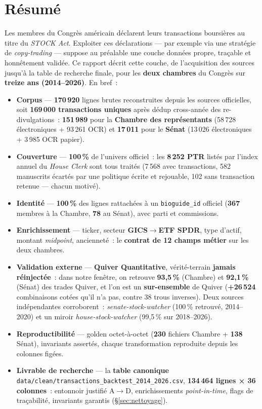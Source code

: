 \documentclass[11pt,a4paper]{article}
\newcommand{\co}[1]{\texttt{\small #1}}
\begin{document}
\section*{Résumé}
Les membres du Congrès américain déclarent leurs transactions boursières au titre du \emph{STOCK Act}.
Exploiter ces déclarations — par exemple via une stratégie de \emph{copy-trading} — suppose au préalable
une couche données propre, traçable et honnêtement validée. Ce rapport décrit cette couche, de
l'acquisition des sources jusqu'à la table de recherche finale, pour les \textbf{deux chambres} du
Congrès sur \textbf{treize ans (2014--2026)}. En bref~:
\begin{itemize}[nosep,leftmargin=1.5em]
\item \textbf{Corpus} — \textbf{170\,920} lignes brutes reconstruites depuis les sources officielles,
soit \textbf{169\,000 transactions uniques} après dédup cross-année des re-divulgations~:
\textbf{151\,989} pour la \textbf{Chambre des représentants} (58\,728 électroniques + 93\,261 OCR) et
\textbf{17\,011} pour le \textbf{Sénat} (13\,026 électroniques + 3\,985 OCR papier).
\item \textbf{Couverture} — \textbf{100\,\%} de l'univers officiel~: les \textbf{8\,252 PTR} listés par
l'index annuel du \emph{House Clerk} sont tous traités (7\,568 avec transactions, 582 manuscrits écartés
par une politique écrite et rejouable, 102 sans transaction retenue — chacun motivé).
\item \textbf{Identité} — \textbf{100\,\%} des lignes rattachées à un \co{bioguide_id} officiel
(\textbf{367} membres à la Chambre, \textbf{78} au Sénat), avec parti et commissions.
\item \textbf{Enrichissement} — ticker, secteur \textbf{GICS$\rightarrow$ETF SPDR}, type d'actif,
montant \emph{midpoint}, ancienneté~: le \textbf{contrat de 12 champs métier} sur les deux chambres.
\item \textbf{Validation externe} — \textbf{Quiver Quantitative}, vérité-terrain \textbf{jamais
réinjectée}~: dans notre fenêtre, on retrouve \textbf{93,5\,\%} (Chambre) et \textbf{92,1\,\%} (Sénat)
des trades Quiver, et l'on est un \textbf{sur-ensemble} de Quiver (\textbf{+26\,524} combinaisons cotées
qu'il n'a pas, contre 38 trous inverses). Deux sources indépendantes corroborent~:
\emph{senate-stock-watcher} (100\,\% retrouvé, 2014--2020) et un miroir \emph{house-stock-watcher}
(99,5\,\% sur 2018--2026).
\item \textbf{Reproductibilité} — golden octet-à-octet (\textbf{230} fichiers Chambre + \textbf{138}
Sénat), invariants assertés, chaque transformation reproduite depuis les colonnes figées.
\item \textbf{Livrable de recherche} — la \textbf{table canonique}
\co{data/clean/transactions_backtest_2014_2026.csv}, \textbf{134\,464 lignes × 36 colonnes}~: entonnoir
justifié A$\rightarrow$D, enrichissements \emph{point-in-time}, flags de traçabilité, invariants
garantis (\S{}\ref{sec:nettoyage}).
\end{itemize}
\end{document}
